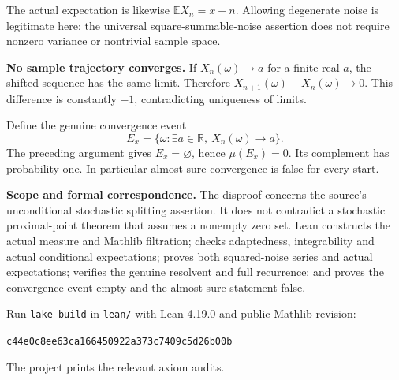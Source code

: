 \documentclass[11pt,a4paper]{article}
\begin{document}
The actual expectation is likewise
$\mathbb E X_n=x-n$.
Allowing degenerate noise is legitimate here: the universal
square-summable-noise assertion does not require nonzero
variance or nontrivial sample space.

\textbf{No sample trajectory converges.}
If $X_n(\omega)\to a$ for a finite real $a$, the shifted sequence
has the same limit. Therefore
$X_{n+1}(\omega)-X_n(\omega)\to0$.
This difference is constantly $-1$, contradicting uniqueness
of limits.

Define the genuine convergence event
\[
 E_x=\{\omega:\exists a\in\mathbb R,\ X_n(\omega)\to a\}.
\]
The preceding argument gives $E_x=\varnothing$, hence
$\mu(E_x)=0$. Its complement has probability one.
In particular almost-sure convergence is false for every start.

\textbf{Scope and formal correspondence.}
The disproof concerns the source's unconditional stochastic
splitting assertion. It does not contradict a stochastic
proximal-point theorem that assumes a nonempty zero set.
Lean constructs the actual measure and Mathlib filtration;
checks adaptedness, integrability and actual conditional
expectations; proves both squared-noise series and actual
expectations; verifies the genuine resolvent and full recurrence;
and proves the convergence event empty and the almost-sure
statement false.

Run \texttt{lake build} in \texttt{lean/} with Lean 4.19.0 and
public Mathlib revision:
\begin{center}\small
\texttt{c44e0c8ee63ca166450922a373c7409c5d26b00b}
\end{center}
The project prints the relevant axiom audits.
\end{document}
